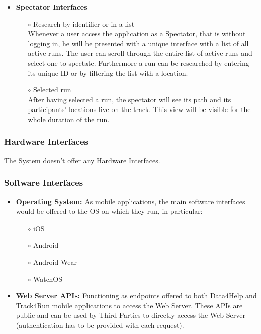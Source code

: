 \documentclass[titlepage]{article}
\begin{document}
\begin{itemize}
\begin{itemize}
\begin{itemize}
				\end{itemize}
				\item{\bf Spectator Interfaces} \\
				\begin{itemize}
					\item[$\circ$] Research by identifier or in a list \\
					Whenever a user access the application as a Spectator, that is without logging in, he will be presented with a unique interface with a list of all active runs. The user can scroll through the entire list of active runs and select one to spectate. Furthermore a run can be researched by entering its unique ID or by filtering the list with a location.
					\item[$\circ$] Selected run \\
					After having selected a run, the spectator will see its path and its participants’ locations live on the track. This view will be visible for the whole duration of the run.
				\end{itemize}
			\end{itemize}
		\end{itemize}
						
		\subsubsection{Hardware Interfaces}
		The System doesn’t offer any Hardware Interfaces.
			
		\subsubsection{Software Interfaces}
		\begin{itemize}
			\item{\bf Operating System: } As mobile applications, the main software interfaces would be offered to the OS on which they run, in particular:
			\begin{itemize}
				\item[$\circ$] iOS
				\item[$\circ$]Android
				\item[$\circ$] Android Wear
				\item[$\circ$] WatchOS
			\end{itemize}
			\item{\bf Web Server APIs: } Functioning as endpoints offered to both Data4Help and Track4Run mobile applications to access the Web Server.
These APIs are public and can be used by Third Parties to directly access the Web Server (authentication has to be provided with each request).

		\end{itemize}
			
\end{document}
